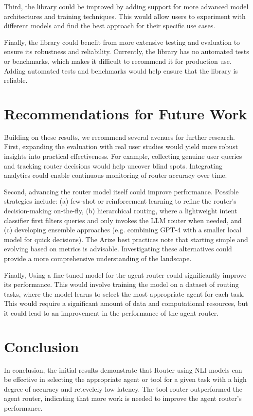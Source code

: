 Third, the library could be improved by adding support for more advanced model architectures and training techniques. This would allow users to experiment with different models and find the best approach for their specific use cases.

Finally, the library could benefit from more extensive testing and evaluation to ensure its robustness and reliability. Currently, the library has no automated tests or benchmarks, which makes it difficult to recommend it for production use. Adding automated tests and benchmarks would help ensure that the library is reliable.

\section{Recommendations for Future Work}
\label{sec:results-recommendations}

Building on these results, we recommend several avenues for further research. First, expanding the evaluation with real user studies would yield more robust insights into practical effectiveness. For example, collecting genuine user queries and tracking router decisions would help uncover blind spots. Integrating analytics could enable continuous monitoring of router accuracy over time.

Second, advancing the router model itself could improve performance. Possible strategies include: (a) few-shot or reinforcement learning to refine the router’s decision-making on-the-fly, (b) hierarchical routing, where a lightweight intent classifier first filters queries and only invokes the LLM router when needed, and (c) developing ensemble approaches (e.g. combining GPT-4 with a smaller local model for quick decisions). The Arize best practices note that starting simple and evolving based on metrics is advisable. Investigating these alternatives could provide a more comprehensive understanding of the landscape.

Finally, Using a fine-tuned model for the agent router could significantly improve its performance. This would involve training the model on a dataset of routing tasks, where the model learns to select the most appropriate agent for each task. This would require a significant amount of data and computational resources, but it could lead to an improvement in the performance of the agent router.




\section{Conclusion}
\label{sec:results-conclusion}
In conclusion, the initial results demonstrate that Router using NLI models can be effective in selecting the appropriate agent or tool for a given task with a high degree of accuracy and retevelely low latency. The tool router outperformed the agent router, indicating that more work is needed to improve the agent router's performance.

